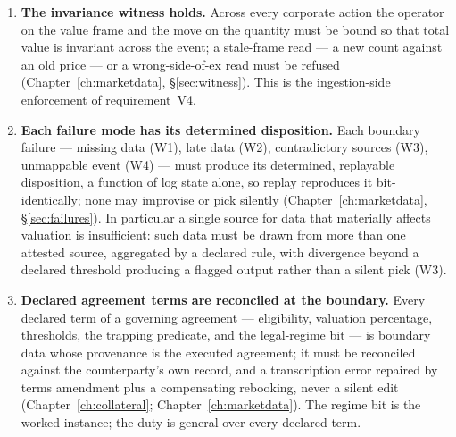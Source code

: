 \begin{enumerate}[label=\textbf{B\arabic*.}, ref=B\arabic*, leftmargin=*, itemsep=3pt]
  never be overwritten by its adjustment.
\item \textbf{The invariance witness holds.} Across every corporate action the operator on
  the value frame and the move on the quantity must be bound so that total value is
  invariant across the event; a stale-frame read --- a new count against an old price ---
  or a wrong-side-of-ex read must be refused
  (Chapter~\ref{ch:marketdata}, \S\ref{sec:witness}). This is the ingestion-side
  enforcement of requirement~V4.
\item \textbf{Each failure mode has its determined disposition.} Each boundary failure
  --- missing data (W1), late data (W2), contradictory sources (W3), unmappable event
  (W4) --- must produce its determined, replayable disposition, a function of log state
  alone, so replay reproduces it bit-identically; none may improvise or pick silently
  (Chapter~\ref{ch:marketdata}, \S\ref{sec:failures}). In particular a single source for
  data that materially affects valuation is insufficient: such data must be drawn from
  more than one attested source, aggregated by a declared rule, with divergence beyond a
  declared threshold producing a flagged output rather than a silent pick (W3).
\item \textbf{Declared agreement terms are reconciled at the boundary.} Every declared
  term of a governing agreement --- eligibility, valuation percentage, thresholds, the
  trapping predicate, and the legal-regime bit --- is boundary data whose provenance is the
  executed agreement; it must be reconciled against the counterparty's own record, and a
  transcription error repaired by terms amendment plus a compensating rebooking, never a
  silent edit (Chapter~\ref{ch:collateral}; Chapter~\ref{ch:marketdata}). The regime bit is
  the worked instance; the duty is general over every declared term.
\end{enumerate}

